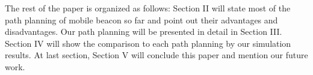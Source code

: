 \documentclass[conference]{IEEEtran}
\begin{document}
The rest of the paper is organized as follows: Section II will state most of the path planning of mobile beacon so far and point out their advantages and disadvantages. Our path planning will be presented in detail in Section III. Section IV will show the comparison to each path planning by our simulation results. At last section, Section V will conclude this paper and mention our future work. 



%
%



%
%
\end{document}
